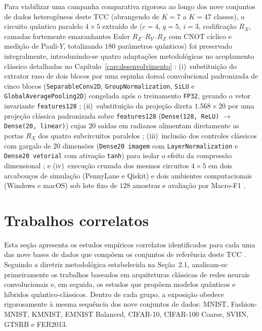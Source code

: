 \documentclass[
    12pt,
    openright,
    oneside,
    a4paper,
    english,
    brazil
]{abntex2}
\begin{document}
Para viabilizar uma campanha comparativa rigorosa ao longo dos nove conjuntos de dados heterogêneos deste TCC (abrangendo de \(K = 7\) a \(K = 47\) classes), o circuito quântico paralelo \(4 \times 5\) extraído de  (\(c = 4\), \(q = 5\), \(i = 3\), codificação \(R_X\), camadas fortemente emaranhantes Euler \(R_Z\text{--}R_Y\text{--}R_Z\) com \(\text{CNOT}\) cíclico e medição de Pauli-\(Y\), totalizando \(180\) parâmetros quânticos) foi preservado integralmente, introduzindo-se quatro adaptações metodológicas no acoplamento clássico detalhadas no Capítulo~\ref{cap:desenvolvimento} \cite{senokosov2024qml,Wazlawick2020}: (i)~substituição do extrator raso de dois blocos por uma espinha dorsal convolucional padronizada de cinco blocos (\texttt{Separable\-Conv2D}, \texttt{Group\-Normalization}, \texttt{SiLU} e \texttt{Global\-Average\-Pooling2D}) congelada após o treinamento \texttt{FP32}, gerando o vetor invariante \texttt{features128} \cite{chollet2017xception,wu2018groupnorm,elfwing2018silu}; (ii)~substituição da projeção direta \(1.568 \times 20\) por uma projeção clássica padronizada sobre \texttt{features128} (\texttt{Dense(128, ReLU)} \(\to\) \texttt{Dense(20, linear)}) cujas 20 saídas em radianos alimentam diretamente as portas \(R_X\) dos quatro subcircuitos paralelos \cite{goodfellow2016deep,senokosov2024qml}; (iii)~inclusão dos controles clássicos com gargalo de 20 dimensões (\texttt{Dense20 imagem} com \texttt{Layer\-Normalization} e \texttt{Dense20 vetorial} com ativação \texttt{tanh}) para isolar o efeito da compressão dimensional \cite{ba2016layernorm,Wazlawick2020}; e (iv)~execução cruzada dos mesmos circuitos \(4 \times 5\) em dois arcabouços de simulação (PennyLane e Qiskit) e dois ambientes computacionais (Windows e macOS) sob lote fixo de \(128\) amostras e avaliação por Macro-F1 \cite{bergholm2018pennylane,javadiabhari2024qiskit,sokolova2009systematic}.

\section{Trabalhos correlatos}
\label{sec:trabalhos_correlatos}

Esta seção apresenta os estudos empíricos correlatos identificados para cada uma das nove bases de dados que compõem os conjuntos de referência deste TCC \cite{Wazlawick2020}. Seguindo a diretriz metodológica estabelecida na Seção~2.1, analisam-se primeiramente os trabalhos baseados em arquiteturas clássicas de redes neurais convolucionais e, em seguida, os estudos que propõem modelos quânticos e híbridos quântico-clássicos. Dentro de cada grupo, a exposição obedece rigorosamente à mesma sequência dos nove conjuntos de dados: MNIST, Fashion-MNIST, KMNIST, EMNIST Balanced, CIFAR-10, CIFAR-100 Coarse, SVHN, GTSRB e FER2013.
\end{document}
